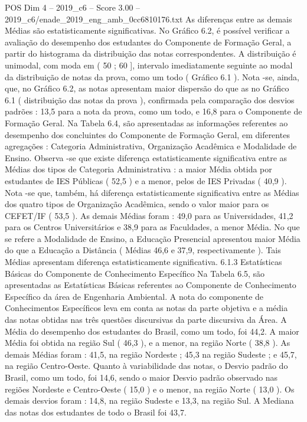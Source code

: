 \begin{textsample}{POS Dim 4 – 2019\_c6 – Score 3.00 – 2019\_c6/enade\_2019\_eng\_amb\_0cc6810176.txt}
As diferenças entre as demais Médias são estatisticamente significativas.
No Gráfico 6.2, é possível verificar a avaliação do desempenho dos estudantes do Componente de Formação Geral, a partir do histograma da distribuição das notas correspondentes.
A distribuição é unimodal, com moda em ( 50 ; 60 ], intervalo imediatamente seguinte ao modal da distribuição de notas da prova, como um todo ( Gráfico 6.1 ).
Nota -se, ainda, que, no Gráfico 6.2, as notas apresentam maior dispersão do que as no Gráfico 6.1 ( distribuição das notas da prova ), confirmada pela comparação dos desvios padrões : 13,5 para a nota da prova, como um todo, e 16,8 para o Componente de Formação Geral.
Na Tabela 6.4, são apresentadas as informações referentes ao desempenho dos concluintes do Componente de Formação Geral, em diferentes agregações : Categoria Administrativa, Organização Acadêmica e Modalidade de Ensino.
Observa -se que existe diferença estatisticamente significativa entre as Médias dos tipos de Categoria Administrativa : a maior Média obtida por estudantes de IES Públicas ( 52,5 ) e a menor, pelos de IES Privadas ( 40,9 ).
Nota -se que, também, há diferença estatisticamente significativa entre as Médias dos quatro tipos de Organização Acadêmica, sendo o valor maior para os CEFET/IF ( 53,5 ).
As demais Médias foram : 49,0 para as Universidades, 41,2 para os Centros Universitários e 38,9 para as Faculdades, a menor Média.
No que se refere a Modalidade de Ensino, a Educação Presencial apresentou maior Média do que a Educação a Distância ( Médias 46,6 e 37,9, respectivamente ).
Tais Médias apresentam diferença estatisticamente significativa. 6.1.3 Estatísticas Básicas do Componente de Conhecimento Específico Na Tabela 6.5, são apresentadas as Estatísticas Básicas referentes ao Componente de Conhecimento Específico da área de Engenharia Ambiental.
A nota do componente de Conhecimentos Específicos leva em conta as notas da parte objetiva e a média das notas obtidas nas três questões discursivas da parte discursiva da Área.
A Média do desempenho dos estudantes do Brasil, como um todo, foi 44,2.
A maior Média foi obtida na região Sul ( 46,3 ), e a menor, na região Norte ( 38,8 ).
As demais Médias foram : 41,5, na região Nordeste ; 45,3 na região Sudeste ; e 45,7, na região Centro-Oeste.
Quanto à variabilidade das notas, o Desvio padrão do Brasil, como um todo, foi 14,6, sendo o maior Desvio padrão observado nas regiões Nordeste e Centro-Oeste ( 15,0 ) e o menor, na região Norte ( 13,0 ).
Os demais desvios foram : 14,8, na região Sudeste e 13,3, na região Sul.
A Mediana das notas dos estudantes de todo o Brasil foi 43,7.

\end{textsample}
